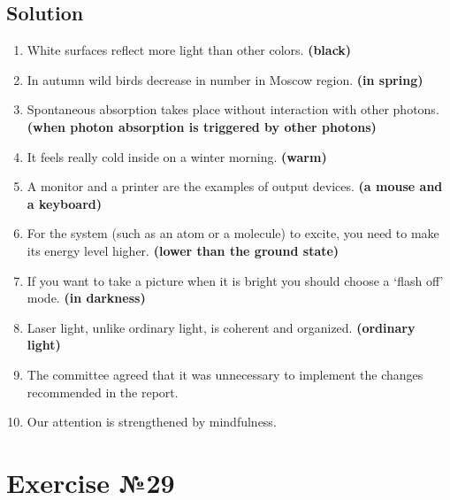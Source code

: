\subsection*{Solution}
\begin{enumerate}
      \item White surfaces reflect more light than other colors. \textbf{(black)}
      \item In autumn wild birds decrease in number in Moscow region. \textbf{(in spring)}
      \item Spontaneous absorption takes place without interaction with other photons.
            \textbf{(when photon absorption is triggered by other photons)}
      \item It feels really cold inside on a winter morning. \textbf{(warm)}
      \item A monitor and a printer are the examples of output devices. \textbf{(a mouse and
                  a keyboard)}
      \item For the system (such as an atom or a molecule) to excite, you need to make
            its energy level higher. \textbf{(lower than the ground state)}
      \item If you want to take a picture when it is bright you should choose a ‘flash
            off’ mode. \textbf{(in darkness)}
      \item Laser light, unlike ordinary light, is coherent and organized. \textbf{(ordinary
                  light)}
      \item The committee agreed that it was unnecessary to implement the changes
            recommended in the report.
      \item Our attention is strengthened by mindfulness.
\end{enumerate}

\section{Exercise №29}
